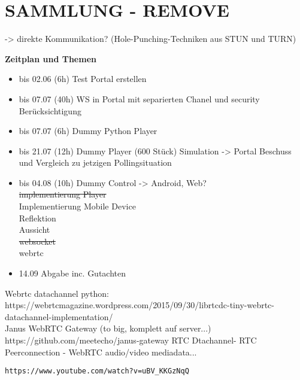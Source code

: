 \newpage
\chapter{SAMMLUNG - REMOVE}
\label{sec:New Section}

	-> direkte Kommunikation? (Hole-Punching-Techniken aus STUN und TURN)	
	
\textbf{Zeitplan und Themen}\\
\begin{itemize}
\item bis 02.06 (6h) Test Portal erstellen
\item bis 07.07 (40h) WS in Portal mit separierten Chanel und security Berücksichtigung
\item bis 07.07 (6h) Dummy Python Player
\item bis 21.07 (12h) Dummy Player (600 Stück) Simulation -> Portal Beschuss und Vergleich zu jetzigen Pollingsituation
\item bis 04.08 (10h) Dummy Control -> Android, Web?
\\\sout{implementierung Player}
\\Implementierung Mobile Device
\\Reflektion
\\Aussicht
\\\sout{websocket}
\\webrtc
\item 14.09 Abgabe inc. Gutachten
\end{itemize}



Webrtc datachannel python: https://webrtcmagazine.wordpress.com/2015/09/30/librtcdc-tiny-webrtc-datachannel-implementation/ \\
Janus WebRTC Gateway (to big, komplett auf server...) https://github.com/meetecho/janus-gateway
RTC Dtachannel- RTC Peerconnection - WebRTC audio/video mediadata... \begin{verbatim}https://www.youtube.com/watch?v=uBV_KKGzNqQ\end{verbatim}

	